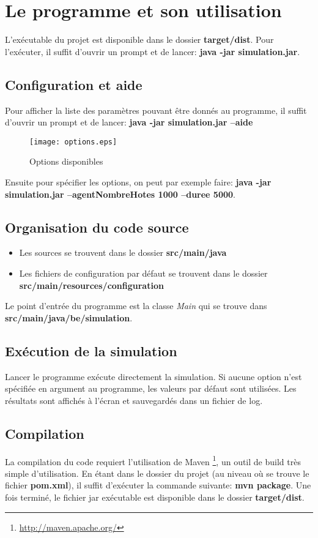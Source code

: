 \appendix

\section{Le programme et son utilisation}
L'exécutable du projet est disponible dans le dossier \textbf{target/dist}. Pour l'exécuter, il suffit d'ouvrir un prompt et de lancer: \textbf{java -jar simulation.jar}.

\subsection{Configuration et aide}
Pour afficher la liste des paramètres pouvant être donnés au programme, il suffit d'ouvrir un prompt et de lancer: \textbf{java -jar simulation.jar --aide}


\begin{figure}[h!t]
  \centering
    \texttt{[image: options.eps]}
  \caption{Options disponibles}
  \label{fig:options}
\end{figure}

Ensuite pour spécifier les options, on peut par exemple faire: \textbf{java -jar simulation.jar --agentNombreHotes 1000 --duree 5000}.

\subsection{Organisation du code source}
\begin{itemize}
 \item Les sources se trouvent dans le dossier \textbf{src/main/java}
 \item Les fichiers de configuration par défaut se trouvent dans le dossier \textbf{src/main/resources/configuration}
\end{itemize}

Le point d'entrée du programme est la classe \textit{Main} qui se trouve dans \textbf{src/main/java/be/simulation}.

\subsection{Exécution de la simulation}
Lancer le programme exécute directement la simulation. Si aucune option n'est spécifiée en argument au programme, les valeurs par défaut sont utilisées. Les résultats sont affichés à l'écran et sauvegardés dans un fichier de log.

\subsection{Compilation}
La compilation du code requiert l'utilisation de Maven \footnote{\url{http://maven.apache.org/}}, un outil de build très simple d'utilisation. En étant dans le dossier du projet (au niveau où se trouve le fichier \textbf{pom.xml}), il suffit d'exécuter la commande suivante: \textbf{mvn package}. Une fois terminé, le fichier jar exécutable est disponible dans le dossier \textbf{target/dist}.

